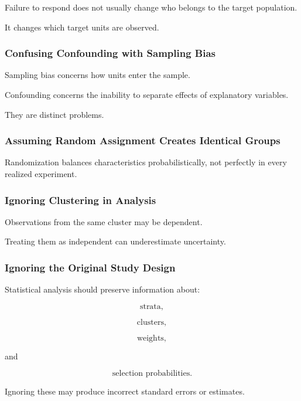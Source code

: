 Failure to respond does not usually change who belongs to the target
population.

It changes which target units are observed.

\subsubsection{Confusing Confounding with Sampling Bias}

Sampling bias concerns how units enter the sample.

Confounding concerns the inability to separate effects of explanatory
variables.

They are distinct problems.

\subsubsection{Assuming Random Assignment Creates Identical Groups}

Randomization balances characteristics probabilistically, not perfectly
in every realized experiment.

\subsubsection{Ignoring Clustering in Analysis}

Observations from the same cluster may be dependent.

Treating them as independent can underestimate uncertainty.

\subsubsection{Ignoring the Original Study Design}

Statistical analysis should preserve information about:

\[
\text{strata},
\]

\[
\text{clusters},
\]

\[
\text{weights},
\]

and

\[
\text{selection probabilities}.
\]

Ignoring these may produce incorrect standard errors or estimates.

